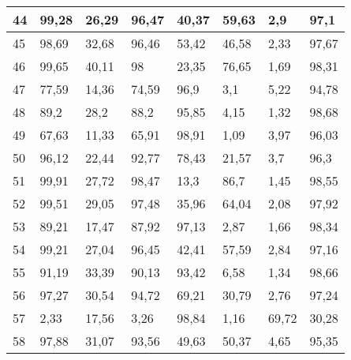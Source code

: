 \begin{longtable}[c]{|l|l|l|l|l|l|l|l|}
44              & 99,28        & 26,29        & 96,47       & 40,37         & 59,63         & 2,9           & 97,1          \\ \hline
45              & 98,69        & 32,68        & 96,46       & 53,42         & 46,58         & 2,33          & 97,67         \\ \hline
46              & 99,65        & 40,11        & 98          & 23,35         & 76,65         & 1,69          & 98,31         \\ \hline
47              & 77,59        & 14,36        & 74,59       & 96,9          & 3,1           & 5,22          & 94,78         \\ \hline
48              & 89,2         & 28,2         & 88,2        & 95,85         & 4,15          & 1,32          & 98,68         \\ \hline
49              & 67,63        & 11,33        & 65,91       & 98,91         & 1,09          & 3,97          & 96,03         \\ \hline
50              & 96,12        & 22,44        & 92,77       & 78,43         & 21,57         & 3,7           & 96,3          \\ \hline
51              & 99,91        & 27,72        & 98,47       & 13,3          & 86,7          & 1,45          & 98,55         \\ \hline
52              & 99,51        & 29,05        & 97,48       & 35,96         & 64,04         & 2,08          & 97,92         \\ \hline
53              & 89,21        & 17,47        & 87,92       & 97,13         & 2,87          & 1,66          & 98,34         \\ \hline
54              & 99,21        & 27,04        & 96,45       & 42,41         & 57,59         & 2,84          & 97,16         \\ \hline
55              & 91,19        & 33,39        & 90,13       & 93,42         & 6,58          & 1,34          & 98,66         \\ \hline
56              & 97,27        & 30,54        & 94,72       & 69,21         & 30,79         & 2,76          & 97,24         \\ \hline
57              & 2,33         & 17,56        & 3,26        & 98,84         & 1,16          & 69,72         & 30,28         \\ \hline
58              & 97,88        & 31,07        & 93,56       & 49,63         & 50,37         & 4,65          & 95,35         \\ \hline

\end{longtable}
